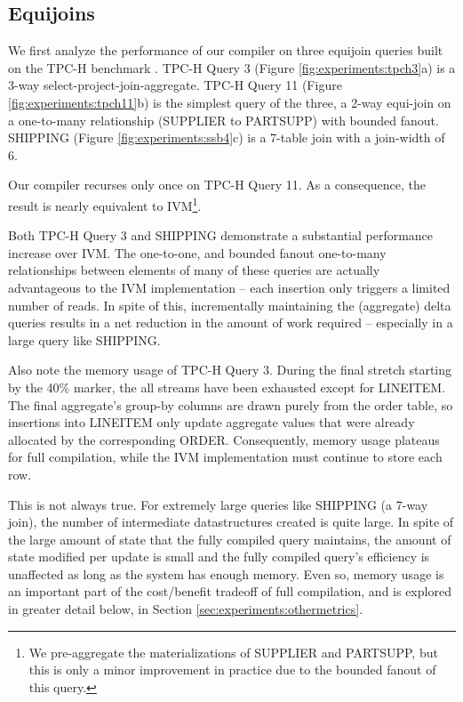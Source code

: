 \subsection{Equijoins}

We first analyze the performance of our compiler on three equijoin queries built on the TPC-H benchmark .  TPC-H Query 3 (Figure \ref{fig:experiments:tpch3}a) is a 3-way select-project-join-aggregate.  TPC-H Query 11 (Figure \ref{fig:experiments:tpch11}b) is the simplest query of the three, a 2-way equi-join on a one-to-many relationship (SUPPLIER to PARTSUPP) with bounded fanout.  SHIPPING (Figure \ref{fig:experiments:ssb4}c) is a 7-table join with a join-width of 6.  

Our compiler recurses only once on TPC-H Query 11.  As a consequence, the result is nearly equivalent to IVM\footnote{We pre-aggregate the materializations of SUPPLIER and PARTSUPP, but this is only a minor improvement in practice due to the bounded fanout of this query.}.  

Both TPC-H Query 3 and SHIPPING demonstrate a substantial performance increase over IVM.  The one-to-one, and bounded fanout one-to-many relationships between elements of many of these queries are actually advantageous to the IVM implementation -- each insertion only triggers a limited number of reads.  In spite of this, incrementally maintaining the (aggregate) delta queries results in a net reduction in the amount of work required -- especially in a large query like SHIPPING.

Also note the memory usage of TPC-H Query 3.  During the final stretch starting by the 40\% marker, the all streams have been exhausted except for LINEITEM.  The final aggregate's group-by columns are drawn purely from the order table, so insertions into LINEITEM only update aggregate values that were already  allocated by the corresponding ORDER.  Consequently, memory usage plateaus for full compilation, while the IVM implementation must continue to store each row.

This is not always true.  For extremely large queries like SHIPPING (a 7-way join), the number of intermediate datastructures created is quite large.  In spite of the large amount of state that the fully compiled query maintains, the amount of state modified per update is small and the fully compiled query's efficiency is unaffected as long as the system has enough memory.  Even so, memory usage is an important part of the cost/benefit tradeoff of full compilation, and is explored in greater detail below, in Section \ref{sec:experiments:othermetrics}.


